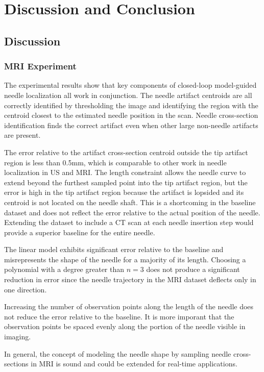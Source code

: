 \chapter{Discussion and Conclusion}
\label{sec:conclusions} %

\section{Discussion}
\subsection{MRI Experiment}
The experimental results show that key components of closed-loop model-guided needle localization all work in conjunction. The needle artifact centroids are all correctly identified by thresholding the image and identifying the region with the centroid closest to the estimated needle position in the scan. Needle cross-section identification finds the correct artifact even when other large non-needle artifacts are present.

The error relative to the artifact cross-section centroid outside the tip artifact region is less than 0.5mm, which is comparable to other work in needle localization in US\cite{rossa_adaptive_2016} and MRI\cite{song_biopsy_2012}. The length constraint allows the needle curve to extend beyond the furthest sampled point into the tip artifact region, but the error is high in the tip artifact region because the artifact is lopsided and its centroid is not located on the needle shaft. This is a shortcoming in the baseline dataset and does not reflect the error relative to the actual position of the needle. Extending the dataset to include a CT scan at each needle insertion step would provide a superior baseline for the entire needle.

The linear model exhibits significant error relative to the baseline and misrepresents the shape of the needle for a majority of its length. Choosing a polynomial with a degree greater than $n=3$ does not produce a significant reduction in error since the needle trajectory in the MRI dataset deflects only in one direction.

Increasing the number of observation points along the length of the needle does not reduce the error relative to the baseline. It is more imporant that the observation points be spaced evenly along the portion of the needle visible in imaging.

In general, the concept of modeling the needle shape by sampling needle cross-sections in MRI is sound and could be extended for real-time applications.

